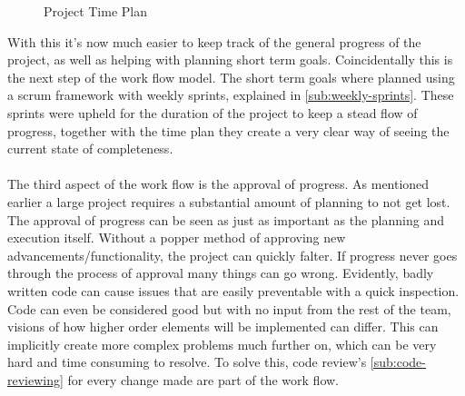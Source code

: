 \begin{figure}[H]
    \centering
    \caption{Project Time Plan}
    \label{fig:time-plan}
\end{figure}

With this it's now much easier to keep track of the general progress of the project, as well as helping with planning short term goals. Coincidentally this is the next step of the work flow model. The short term goals where planned using a scrum framework with weekly sprints, explained in \ref{sub:weekly-sprints}. These sprints were upheld for the duration of the project to keep a stead flow of progress, together with the time plan they create a very clear way of seeing the current state of completeness. 
\\\\
The third aspect of the work flow is the approval of progress. As mentioned earlier a large project requires a substantial amount of planning to not get lost. The approval of progress can be seen as just as important as the planning and execution itself. Without a popper method of approving new advancements/functionality, the project can quickly falter. If progress never goes through the process of approval many things can go wrong. Evidently, badly written code can cause issues that are easily preventable with a quick inspection. Code can even be considered good but with no input from the rest of the team, visions of how higher order elements will be implemented can differ. This can implicitly create  more complex problems much further on, which can be very hard and time consuming to resolve. To solve this, code review's \ref{sub:code-reviewing} for every change made are part of the work flow.  

